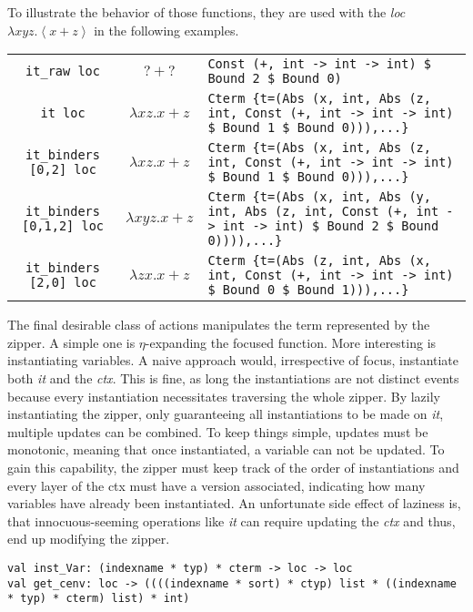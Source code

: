 \documentclass[12pt,a4paper]{article}
\newcommand{\type}[1]{\textit{#1}}
\newcommand{\recordentry}[1]{\textit{#1}}
\newcommand{\function}[1]{\textit{#1}}
\newcommand{\inlineterm}[1]{\fontsize{8}{10}\texttt{#1}}
\begin{document}
To illustrate the behavior of those functions, they are used with the \type{loc} \(\lambda{}xyz. \left\langle x+z \right\rangle \) in the following examples.

\begin{tabularx}{\textwidth}{ccX}
\inlineterm{it\_raw loc}&\(?+?\)&\inlineterm{Const (+, int -> int -> int) \$ Bound 2 \$ Bound 0)}\\
\inlineterm{it loc}&\(\lambda{}xz.x+z\)&\inlineterm{Cterm \{t=(Abs (x, int, Abs (z, int, Const (+, int -> int -> int) \$ Bound 1 \$ Bound 0))),...\}}\\
\inlineterm{it\_binders [0,2] loc}&\(\lambda{}xz.x+z\)&\inlineterm{Cterm \{t=(Abs (x, int, Abs (z, int, Const (+, int -> int -> int) \$ Bound 1 \$ Bound 0))),...\}}\\
\inlineterm{it\_binders [0,1,2] loc}&\(\lambda{}xyz.x+z\)&\inlineterm{Cterm \{t=(Abs (x, int, Abs (y, int, Abs (z, int, Const (+, int -> int -> int) \$ Bound 2 \$ Bound 0)))),...\}}\\
\inlineterm{it\_binders [2,0] loc}&\(\lambda{}zx.x+z\)&\inlineterm{Cterm \{t=(Abs (z, int, Abs (x, int, Const (+, int -> int -> int) \$ Bound 0 \$ Bound 1))),...\}}
\end{tabularx}

The final desirable class of actions manipulates the term represented by the zipper.
A simple one is \(\eta\)-expanding the focused function.
More interesting is instantiating variables.
A naive approach would, irrespective of focus, instantiate both \recordentry{it} and the \recordentry{ctx}.
This is fine, as long the instantiations are not distinct events because every instantiation necessitates traversing the whole zipper.
By lazily instantiating the zipper, only guaranteeing all instantiations to be made on \recordentry{it}, multiple updates can be combined.
To keep things simple, updates must be monotonic, meaning that once instantiated, a variable can not be updated.
To gain this capability, the zipper must keep track of the order of instantiations and every layer of the ctx must have a version associated, indicating how many variables have already been instantiated.
An unfortunate side effect of laziness is, that innocuous-seeming operations like \function{it} can require updating the \recordentry{ctx} and thus, end up modifying the zipper.

\begin{lstlisting}
val inst_Var: (indexname * typ) * cterm -> loc -> loc
val get_cenv: loc -> ((((indexname * sort) * ctyp) list * ((indexname * typ) * cterm) list) * int)
\end{lstlisting}
\end{document}
